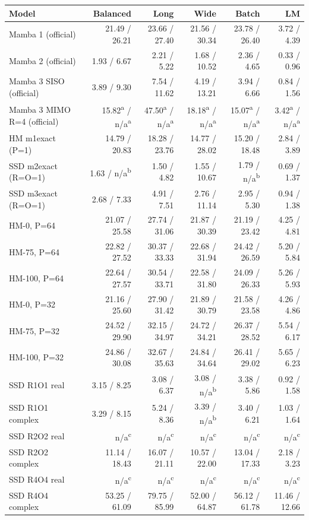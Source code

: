 \begin{tabular}{@{}lrrrrr@{}}
\toprule
Model & Balanced & Long & Wide & Batch & LM \\
\midrule
Mamba 1 (official) & 21.49 / 26.21 & 23.66 / 27.40 & 21.56 / 30.34 & 23.78 / 26.40 & 3.72 / 4.39 \\
Mamba 2 (official) & 1.93 / 6.67 & 2.21 / 5.22 & 1.68 / 10.52 & 2.36 / 4.65 & 0.33 / 0.96 \\
Mamba 3 SISO (official) & 3.89 / 9.30 & 7.54 / 11.62 & 4.19 / 13.21 & 3.94 / 6.66 & 0.84 / 1.56 \\
Mamba 3 MIMO R=4 (official) & 15.82\textsuperscript{a} / n/a\textsuperscript{a} & 47.50\textsuperscript{a} / n/a\textsuperscript{a} & 18.18\textsuperscript{a} / n/a\textsuperscript{a} & 15.07\textsuperscript{a} / n/a\textsuperscript{a} & 3.42\textsuperscript{a} / n/a\textsuperscript{a} \\
HM m1exact (P=1) & 14.79 / 20.83 & 18.28 / 23.76 & 14.77 / 28.02 & 15.20 / 18.48 & 2.84 / 3.89 \\
SSD m2exact (R=O=1) & 1.63 / n/a\textsuperscript{b} & 1.50 / 4.82 & 1.55 / 10.67 & 1.79 / n/a\textsuperscript{b} & 0.69 / 1.37 \\
SSD m3exact (R=O=1) & 2.68 / 7.33 & 4.91 / 7.51 & 2.76 / 11.14 & 2.95 / 5.30 & 0.94 / 1.38 \\
HM-0, P=64 & 21.07 / 25.58 & 27.74 / 31.06 & 21.87 / 30.39 & 21.19 / 23.42 & 4.25 / 4.81 \\
HM-75, P=64 & 22.82 / 27.52 & 30.37 / 33.33 & 22.68 / 31.94 & 24.42 / 26.59 & 5.20 / 5.84 \\
HM-100, P=64 & 22.64 / 27.57 & 30.54 / 33.71 & 22.58 / 31.80 & 24.09 / 26.33 & 5.26 / 5.93 \\
HM-0, P=32 & 21.16 / 25.60 & 27.90 / 31.42 & 21.89 / 30.79 & 21.58 / 23.58 & 4.26 / 4.86 \\
HM-75, P=32 & 24.52 / 29.90 & 32.15 / 34.97 & 24.72 / 34.21 & 26.37 / 28.52 & 5.54 / 6.17 \\
HM-100, P=32 & 24.86 / 30.08 & 32.67 / 35.63 & 24.84 / 34.64 & 26.41 / 29.02 & 5.65 / 6.23 \\
SSD R1O1 real & 3.15 / 8.25 & 3.08 / 6.37 & 3.08 / n/a\textsuperscript{b} & 3.38 / 5.86 & 0.92 / 1.58 \\
SSD R1O1 complex & 3.29 / 8.15 & 5.24 / 8.36 & 3.39 / n/a\textsuperscript{b} & 3.40 / 6.21 & 1.03 / 1.64 \\
SSD R2O2 real & n/a\textsuperscript{c} & n/a\textsuperscript{c} & n/a\textsuperscript{c} & n/a\textsuperscript{c} & n/a\textsuperscript{c} \\
SSD R2O2 complex & 11.14 / 18.43 & 16.07 / 21.11 & 10.57 / 22.00 & 13.04 / 17.33 & 2.18 / 3.23 \\
SSD R4O4 real & n/a\textsuperscript{c} & n/a\textsuperscript{c} & n/a\textsuperscript{c} & n/a\textsuperscript{c} & n/a\textsuperscript{c} \\
SSD R4O4 complex & 53.25 / 61.09 & 79.75 / 85.99 & 52.00 / 64.87 & 56.12 / 61.78 & 11.46 / 12.66 \\
\bottomrule
\end{tabular}
